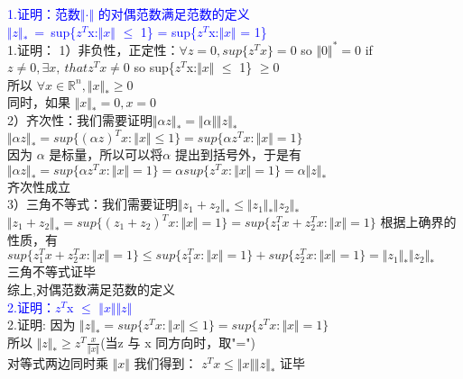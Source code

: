 \documentclass{article}
\begin{document}
\textcolor{blue}{1.证明：范数$\Vert · \Vert$ 的对偶范数满足范数的定义\\
$\Vert z \Vert_*$\, = \,sup\{$z^T$x:$\Vert x \Vert$ $\leq$ 1\} = sup\{$z^T$x:$\Vert x \Vert$ = 1\}}\\
1.证明：
1）非负性，正定性：$\forall z = 0, sup\{z^T x\} = 0 $ so $\Vert 0 \Vert^* = 0 $
if $z \neq 0, \exists x ,\ that z^T x \neq 0$ so sup\{$z^T$x:$\Vert x \Vert$ $\leq$ 1\} $\geq 0$\\
所以 $\forall x \in \mathbb{R}^n, \Vert x \Vert_* \geq 0 $\\
同时，如果 $\Vert x \Vert_* = 0, x = 0$\\
2）齐次性：我们需要证明$\Vert \alpha z \Vert_* = \Vert \alpha \Vert \Vert z \Vert_*$\\
$\Vert \alpha z \Vert_* = sup\{(\alpha z)^T x:\Vert x \Vert \leq 1\} = sup\{\alpha z^Tx:\Vert x \Vert = 1\}$\\
因为 $\alpha$ 是标量，所以可以将$\alpha$ 提出到括号外，于是有\\
$\Vert \alpha z \Vert_* = sup\{\alpha z^Tx:\Vert x \Vert = 1\} = \alpha sup\{ z^Tx:\Vert x \Vert = 1\} = \alpha \Vert z \Vert_*$\\
齐次性成立\\
3）三角不等式：我们需要证明$\Vert z_1 + z_2 \Vert_* \leq \Vert z_1 \Vert_* \Vert z_2 \Vert_*$\\
$\Vert z_1 + z_2 \Vert_* = sup\{ (z_1+z_2)^Tx:\Vert x \Vert = 1\} =  sup\{ z_1^T x +z_2^T x:\Vert x \Vert = 1\}$
根据上确界的性质，有$sup\{ z_1^T x +z_2^T x:\Vert x \Vert = 1\} \leq sup\{ z_1^T x:\Vert x \Vert = 1\} + sup\{z_2^T x:\Vert x \Vert = 1\} = \Vert z_1 \Vert_* \Vert z_2 \Vert_*$\\
三角不等式证毕\\
综上,对偶范数满足范数的定义\\
\textcolor{blue}{2.证明：$z^T$x $\leq$ $\Vert x \Vert$$\Vert z \Vert$}\\
2.证明:
因为 $\Vert z \Vert_* = sup\{z^Tx:\Vert x \Vert \leq 1\} = sup\{z^Tx:\Vert x \Vert = 1\}$\\
所以 $\Vert z \Vert_* \geq z^T \frac{x}{\Vert x \Vert}$(当z 与 x 同方向时，取"=")\\
对等式两边同时乘 $\Vert x \Vert$ 我们得到： $z^T x \leq  \Vert x \Vert \Vert z \Vert_*$ 
证毕
\end{document}
